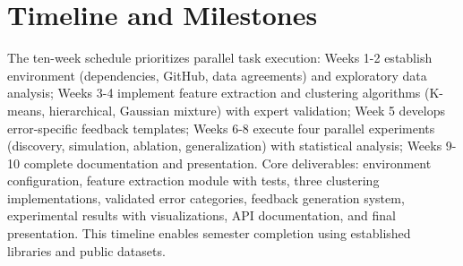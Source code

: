 \documentclass[conference]{IEEEtran}
\begin{document}
\section{Timeline and Milestones}

The ten-week schedule prioritizes parallel task execution: Weeks 1-2 establish environment (dependencies, GitHub, data agreements) and exploratory data analysis; Weeks 3-4 implement feature extraction and clustering algorithms (K-means, hierarchical, Gaussian mixture) with expert validation; Week 5 develops error-specific feedback templates; Weeks 6-8 execute four parallel experiments (discovery, simulation, ablation, generalization) with statistical analysis; Weeks 9-10 complete documentation and presentation. Core deliverables: environment configuration, feature extraction module with tests, three clustering implementations, validated error categories, feedback generation system, experimental results with visualizations, API documentation, and final presentation. This timeline enables semester completion using established libraries and public datasets.
\end{document}
